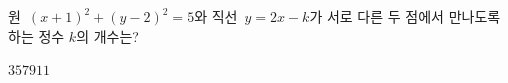 원~$(x+1)^2+(y-2)^2=5$와 직선~$y=2x-k$가 서로 다른 두 점에서 만나도록 하는 정수 $k$의 개수는?
\begin{choices32}{$3$}{$5$}{$7$}{$9$}{$11$}\end{choices32}
